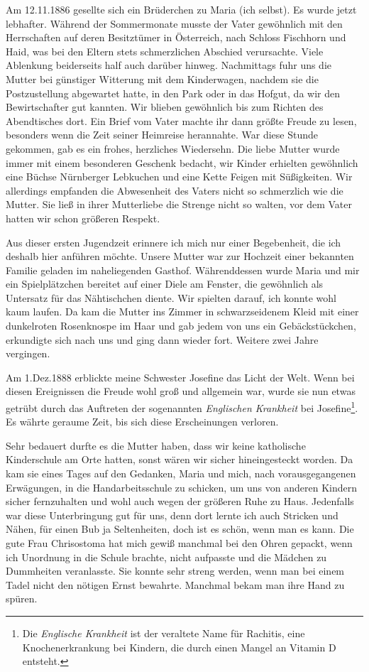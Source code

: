 \documentclass[a4paper,11pt]{article}
\begin{document}
Am 12.11.1886 gesellte sich ein Brüderchen zu Maria (ich selbst). Es wurde jetzt lebhafter. Während der Sommermonate musste der Vater gewöhnlich mit den Herrschaften auf deren Besitztümer in Österreich, nach Schloss Fischhorn und Haid, was bei den Eltern stets schmerzlichen Abschied verursachte. Viele Ablenkung beiderseits half auch darüber hinweg. Nachmittags fuhr uns die Mutter bei günstiger Witterung mit dem Kinderwagen, nachdem sie die Postzustellung abgewartet hatte, in den Park oder in das Hofgut, da wir den Bewirtschafter gut kannten. Wir blieben gewöhnlich bis zum Richten des Abendtisches dort. Ein Brief vom Vater machte ihr dann größte Freude zu lesen, besonders wenn die Zeit seiner Heimreise herannahte. War diese Stunde gekommen, gab es ein frohes, herzliches Wiedersehn. Die liebe Mutter wurde immer mit einem besonderen Geschenk bedacht, wir Kinder erhielten gewöhnlich eine Büchse Nürnberger Lebkuchen und eine Kette Feigen mit Süßigkeiten. Wir allerdings empfanden die Abwesenheit des Vaters nicht so schmerzlich wie die Mutter. Sie ließ in ihrer Mutterliebe die Strenge nicht so walten, vor dem Vater hatten wir schon größeren Respekt.

Aus dieser ersten Jugendzeit erinnere ich mich nur einer Begebenheit, die ich deshalb hier anführen möchte. Unsere Mutter war zur Hochzeit einer bekannten Familie geladen im naheliegenden Gasthof. Währenddessen wurde Maria und mir ein Spielplätzchen bereitet auf einer Diele am Fenster, die gewöhnlich als Untersatz für das Nähtischchen diente. Wir spielten darauf, ich konnte wohl kaum laufen. Da kam die Mutter ins Zimmer in schwarzseidenem Kleid mit einer dunkelroten Rosenknospe im Haar und gab jedem von uns ein Gebäckstückchen, erkundigte sich nach uns und ging dann wieder fort. Weitere zwei Jahre vergingen.

Am 1.Dez.1888 erblickte meine Schwester Josefine das Licht der Welt. Wenn bei diesen Ereignissen die Freude wohl groß und allgemein war, wurde sie nun etwas getrübt durch das Auftreten der sogenannten \textit{Englischen Krankheit} bei Josefine\footnote{Die \textit{Englische Krankheit} ist der veraltete Name für Rachitis, eine Knochenerkrankung bei Kindern, die durch einen Mangel an Vitamin D entsteht.}. Es währte geraume Zeit, bis sich diese Erscheinungen verloren. 

Sehr bedauert durfte es die Mutter haben, dass wir keine katholische Kinderschule am Orte hatten, sonst wären wir sicher hineingesteckt worden. Da kam sie eines Tages auf den Gedanken, Maria und mich, nach vorausgegangenen Erwägungen, in die Handarbeitsschule zu schicken, um uns von anderen Kindern sicher fernzuhalten und wohl auch wegen der größeren Ruhe zu Haus. Jedenfalls war diese Unterbringung gut für uns, denn dort lernte ich auch Stricken und Nähen, für einen Bub ja Seltenheiten, doch ist es schön, wenn man es kann. Die gute Frau Chrisostoma hat mich gewiß manchmal bei den Ohren gepackt, wenn ich Unordnung in die Schule brachte, nicht aufpasste und die Mädchen zu Dummheiten veranlasste. Sie konnte sehr streng werden, wenn man bei einem Tadel nicht den nötigen Ernst bewahrte. Manchmal bekam man ihre Hand zu spüren.
\end{document}
